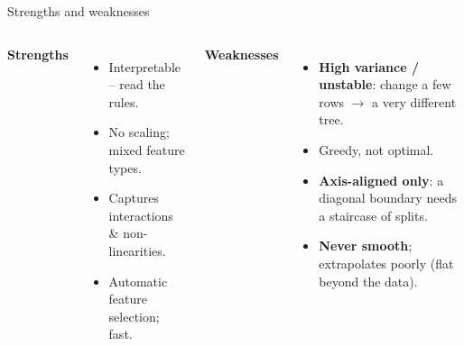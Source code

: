 \documentclass[aspectratio=169]{beamer}
\begin{document}
\begin{frame}{Strengths and weaknesses}
  \begin{columns}[T]
    \textbf{Strengths}
    \begin{itemize}\small
      \item Interpretable -- read the rules.
      \item No scaling; mixed feature types.
      \item Captures interactions \& non-linearities.
      \item Automatic feature selection; fast.
    \end{itemize}
    \textbf{Weaknesses}
    \begin{itemize}\small
      \item \textbf{High variance / unstable}: change a few rows $\to$ a very different
        tree.
      \item Greedy, not optimal.
      \item \textbf{Axis-aligned only}: a diagonal boundary needs a staircase of splits.
      \item \textbf{Never smooth}; extrapolates poorly (flat beyond the data).
    \end{itemize}
  \end{columns}
  \vfill
\end{frame}
\end{document}
